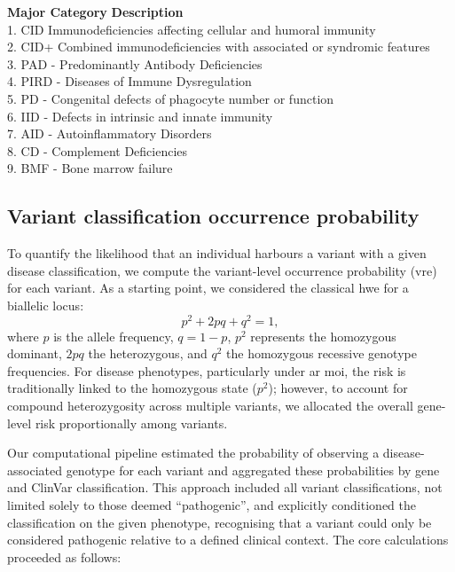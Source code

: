 \begin{tcolorbox}[colback=black!01, colframe=black!70, title=Box \ref{box:definitions} Definitions for IEI Major Disease Categories, label=box:definitions]
\textbf{Major Category} \hspace{4em} \textbf{Description}\\[5pt]
1. CID  Immunodeficiencies affecting cellular and humoral immunity\\[2pt]
2. CID+  Combined immunodeficiencies with associated or syndromic features\\[2pt]
3. PAD - Predominantly Antibody Deficiencies\\[2pt]
4. PIRD - Diseases of Immune Dysregulation\\[2pt]
5. PD - Congenital defects of phagocyte number or function\\[2pt]
6. IID - Defects in intrinsic and innate immunity\\[2pt]
7. AID - Autoinflammatory Disorders\\[2pt]
8. CD - Complement Deficiencies\\[2pt]
9. BMF - Bone marrow failure
\end{tcolorbox}

\subsection{Variant classification occurrence probability}
To quantify the likelihood that an individual harbours a variant with a given disease classification, we compute the variant-level occurrence probability (\ac{vre}) for each variant.
As a starting point, we considered the classical \ac{hwe} for a biallelic locus:
\[
p^2 + 2pq + q^2 = 1,
\]
where \(p\) is the allele frequency, \(q = 1 - p\), \(p^2\) represents the homozygous dominant, \(2pq\) the heterozygous, and \(q^2\) the homozygous recessive genotype frequencies. For disease phenotypes, particularly under \ac{ar} \ac{moi}, the risk is traditionally linked to the homozygous state (\(p^2\)); however, to account for compound heterozygosity across multiple variants, %
we allocated the overall gene-level risk proportionally among variants.

Our computational pipeline estimated the probability of observing a disease-associated genotype for each variant and aggregated these probabilities by gene and ClinVar classification. This approach included all variant classifications, not limited solely to those deemed ``pathogenic'', and explicitly conditioned the classification on the given phenotype, recognising that a variant could only be considered pathogenic relative to a defined clinical context. The core calculations proceeded as follows:

